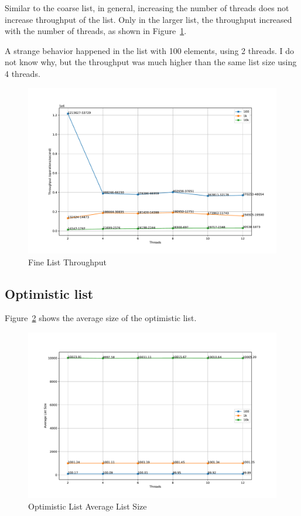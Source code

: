 \documentclass{article}
\begin{document}
Similar to the coarse list, in general, increasing the number of threads does not increase throughput of the list. Only in the larger list, the throughput increased with the number of threads, as shown in Figure~\ref{fig:fine-throughput}.

A strange behavior happened in the list with 100 elements, using 2 threads. I do not know why, but the throughput was much higher than the same list size using 4 threads.

\begin{figure}[H]
    \centering
    \includegraphics[width=\textwidth]{../test/plots/FineListThroughput.pdf}
    \caption{Fine List Throughput}
    \label{fig:fine-throughput}
\end{figure}

\subsection{Optimistic list}

Figure~\ref{fig:optimistic-size} shows the average size of the optimistic list.

\begin{figure}[H]
    \centering
    \includegraphics[scale=0.3]{../test/plots/OptimisticListAverageListSize.pdf}
    \caption{Optimistic List Average List Size}
    \label{fig:optimistic-size}
\end{figure}
\end{document}
